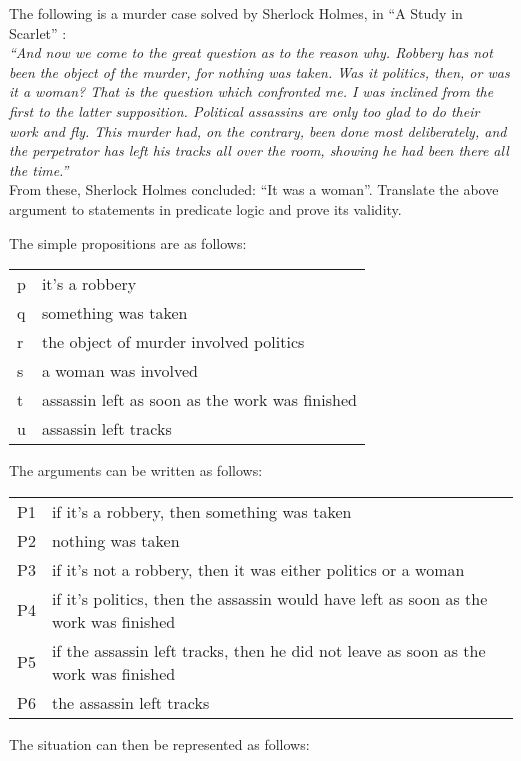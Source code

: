 \documentclass[addpoints]{exam}
\begin{document}
\begin{questions}
\question[10]
  The following is a murder case solved by Sherlock Holmes, in “A Study
  in Scarlet” :\\
  \textit{“And now we come to the great question as to the reason why. Robbery
    has not been the object of the murder, for nothing was taken. Was it
    politics, then, or was it a woman?  That is the question which confronted
    me. I was inclined from the first to the latter supposition. Political
    assassins are only too glad to do their work and fly. This murder had, on
    the contrary, been done most deliberately, and the perpetrator has left
    his tracks all over the room, showing he had been
    there all the time.”}\\
  From these, Sherlock Holmes concluded: ``It was a woman''.  Translate the
  above argument to statements in predicate logic and prove its validity.
  \begin{solution}
    The simple propositions are as follows: \\
    \begin{tabularx}{\textwidth}{l@{ : }X}
      p & it's a robbery \\
      q & something was taken \\
      r & the object of murder involved politics \\
      s & a woman was involved \\
      t & assassin left as soon as the work was finished \\
      u & assassin left tracks
    \end{tabularx}
    The arguments can be written as follows: \\
    \begin{tabularx}{\textwidth}{l@{ : }X}
      P1 & if it's a robbery, then something was taken \\
      P2 & nothing was taken \\ 
      P3 & if it's not a robbery, then it was either politics or a woman \\
      P4 & if it's politics, then the assassin would have left as soon as the work was finished \\
      P5 & if the assassin left tracks, then he did not leave as soon as the work was finished \\
      P6 & the assassin left tracks \\
    \end{tabularx}
    The situation can then be represented as follows: \\
    \begin{tabularx}{\textwidth}{l@{ : }X}

\end{tabularx}
\end{solution}
\end{questions}
\end{document}

